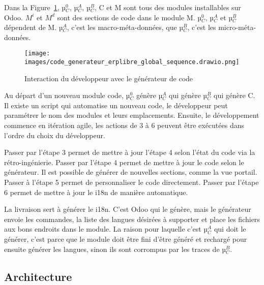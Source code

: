 Dans la Figure~\ref{fig:dia_sequence_gc}, µ$_C^0$, µ$_C^A$, µ$_C^B$, C et M sont tous des modules installables sur Odoo. $M^i$ et $M^d$ sont des sections de code dans le module M. µ$_C^0$, µ$_C^A$ et µ$_C^B$ dépendent de M. µ$_C^A$, c’est les macro-méta-données, que µ$_C^B$, c’est les micro-méta-données.

\begin{figure}
\centering
\texttt{[image: images/code\_generateur\_erplibre\_global\_sequence.drawio.png]}
\caption{Interaction du développeur avec le générateur de code}
\label{fig:dia_sequence_gc}
\end{figure}

Au départ d’un nouveau module code, µ$_C^0$ génère µ$_C^A$ qui génère µ$_C^B$ qui génère C. Il existe un script qui automatise un nouveau code, le développeur peut paramétrer le nom des modules et leurs emplacements. Ensuite, le développement commence en itération agile, les actions de 3 à 6 peuvent être exécutées dans l’ordre du choix du développeur.


Passer par l’étape 3 permet de mettre à jour l’étape 4 selon l’état du code via la rétro-ingénierie. Passer par l’étape 4 permet de mettre à jour le code selon le générateur. Il est possible de générer de nouvelles sections, comme la vue portail. Passer à l’étape 5 permet de personnaliser le code directement. Passer par l’étape 6 permet de mettre à jour le i18n de manière automatique.

La livraison sert à générer le i18n. C’est Odoo qui le génère, mais le générateur envoie les commandes, la liste des langues désirées à supporter et place les fichiers aux bons endroits dans le module. La raison pour laquelle c’est µ$_C^A$ qui doit le générer, c’est parce que le module doit être fini d’être généré et rechargé pour ensuite générer les langues, sinon ils sont corrompus par les traces de µ$_C^B$.


\subsection{Architecture}\label{architecture_result}

